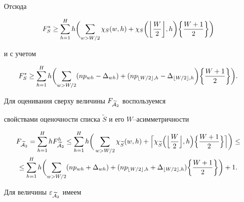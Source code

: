 \begin{pf}
Отсюда 


$$


F_{S}^{*}\ge \SH h 


\biggl(\sum_{w>W/2}\chi_S(w,h) +


\chi_S


\biggl(\biggl\lfloor \frac {W}{2}\biggr\rfloor,h \biggr)


\biggl\{\frac {W+1}{2}\biggr\}\biggr)


$$


и с учетом 


$$


F_{S}^{*}\ge \SH h 


\biggl(\sum_{w>W/2} (np_{wh}-\Delta_{wh})+


(np_{\lfloor W/2\rfloor,h}-


\Delta_{\lfloor W/2 \rfloor,h}


\biggr)


\biggl\{\frac {W+1}{2}\biggr\}\biggr).


$$





Для оценивания сверху величины $F_{\widetilde{\cal A}_{2}}$ воспользуемся


свойствами оценочности списка $\widetilde S$ и его $W$--асимметричности


\begin{gather*}


F_{\widetilde{\cal A}_{2}}= 


\SH h F_{\widetilde{\cal A}_{2}}^{h}\le


\SH h \biggl(\,\sum_{w>W/2}\chi_{\widetilde S}(w,h) +


\Bigl\lceil \chi_{\widetilde S}


\Bigl( \Bigl\lfloor \frac {W}{2} \Bigr\rfloor,h\Bigr)


\Bigl\{\frac {W+1}{2}\Bigr\}\Bigr\rceil\biggr) \le \\


%


\le \SH h \biggl(\sum_{w>W/2}(np_{wh}+\Delta_{wh}) +


(np_{\lfloor W/2 \rfloor,h}+


\Delta_{\lfloor W/2 \rfloor,h})


\biggl\{\frac {W+1}{2}\biggr\}\biggr) +1.


\end{gather*}





Для величины $\varepsilon_{\widetilde{\cal A}_{2}}$ имеем



\end{pf}
